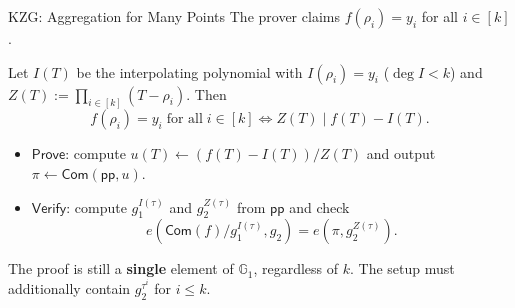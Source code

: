 \documentclass{zkdl-presentation-template}
\begin{document}
    \begin{frame}{KZG: Aggregation for Many Points}
        \small
        The prover claims $f(\rho_i) = y_i$ for all $i \in [k]$.
        \pause

        Let $I(T)$ be the interpolating polynomial with $I(\rho_i) = y_i$ ($\deg I < k$) and $Z(T) := \prod_{i \in [k]}(T - \rho_i)$. Then
        \begin{equation*}
            f(\rho_i) = y_i \; \text{for all} \; i \in [k] \iff Z(T) \mid f(T) - I(T).
        \end{equation*}
        \pause

        \begin{itemize}
            \item $\mathsf{Prove}$: compute $u(T) \gets (f(T) - I(T))/Z(T)$ and output $\pi \gets \mathsf{Com}(\mathsf{pp}, u)$.\pause
            \item $\mathsf{Verify}$: compute $g_1^{I(\tau)}$ and $g_2^{Z(\tau)}$ from $\mathsf{pp}$ and check
            \begin{equation*}
                e(\mathsf{Com}(f)/g_1^{I(\tau)}, g_2) = e(\pi, g_2^{Z(\tau)}).
            \end{equation*}
        \end{itemize}
        \pause

        The proof is still a \textbf{single} element of $\mathbb{G}_1$, regardless of $k$.
        The setup must additionally contain $g_2^{\tau^i}$ for $i \leq k$.
    \end{frame}

    \makeclosingframe
\end{document}
